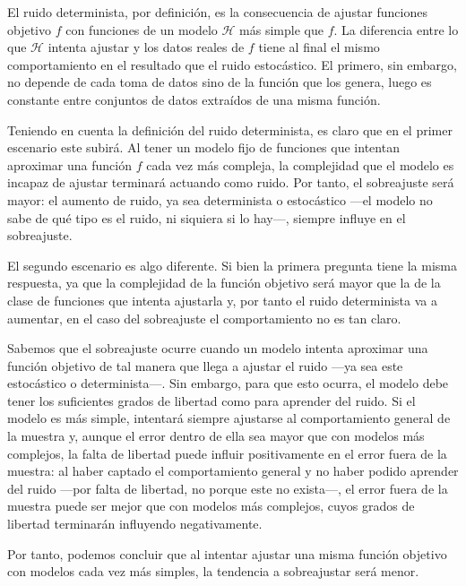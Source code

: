 \documentclass[a4paper, 11pt]{article}
\begin{document}
      \begin{solucion}
        El ruido determinista, por definición, es la consecuencia de ajustar funciones objetivo $f$ con funciones de un modelo $\mathcal{H}$ más simple que $f$. La diferencia entre lo que $\mathcal{H}$ intenta ajustar y los datos reales de $f$ tiene al final el mismo comportamiento en el resultado que el ruido estocástico. El primero, sin embargo, no depende de cada toma de datos sino de la función que los genera, luego es constante entre conjuntos de datos extraídos de una misma función.

        Teniendo en cuenta la definición del ruido determinista, es claro que en el primer escenario este subirá. Al tener un modelo fijo de funciones que intentan aproximar una función $f$ cada vez más compleja, la complejidad que el modelo es incapaz de ajustar terminará actuando como ruido. Por tanto, el sobreajuste será mayor: el aumento de ruido, ya sea determinista o estocástico ---el modelo no sabe de qué tipo es el ruido, ni siquiera si lo hay---, siempre influye en el sobreajuste.

        El segundo escenario es algo diferente. Si bien la primera pregunta tiene la misma respuesta, ya que la complejidad de la función objetivo será mayor que la de la clase de funciones que intenta ajustarla y, por tanto el ruido determinista va a aumentar, en el caso del sobreajuste el comportamiento no es tan claro.

        Sabemos que el sobreajuste ocurre cuando un modelo intenta aproximar una función objetivo de tal manera que llega a ajustar el ruido ---ya sea este estocástico o determinista---. Sin embargo, para que esto ocurra, el modelo debe tener los suficientes grados de libertad como para aprender del ruido. Si el modelo es más simple, intentará siempre ajustarse al comportamiento general de la muestra y, aunque el error dentro de ella sea mayor que con modelos más complejos, la falta de libertad puede influir positivamente en el error fuera de la muestra: al haber captado el comportamiento general y no haber podido aprender del ruido ---por falta de libertad, no porque este no exista---, el error fuera de la muestra puede ser mejor que con modelos más complejos, cuyos grados de libertad terminarán influyendo negativamente.

        Por tanto, podemos concluir que al intentar ajustar una misma función objetivo con modelos cada vez más simples, la tendencia a sobreajustar será menor.

      \end{solucion}
\end{document}
